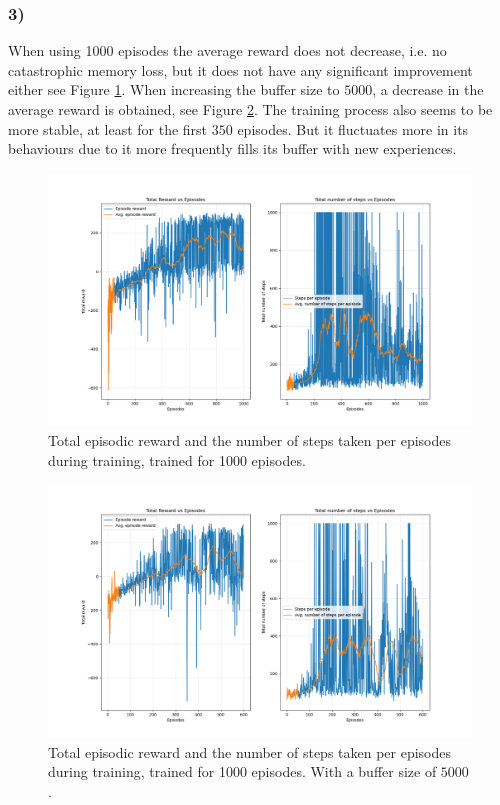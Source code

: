 \documentclass{article}
\begin{document}
\subsubsection*{3)}
When using 1000 episodes the average reward does not decrease, i.e. no catastrophic memory loss, but it does not have any significant improvement either see Figure \ref{fig:episodes1000}. When increasing the buffer size to $5000$, a decrease in the average reward is obtained, see Figure \ref{fig:buffer5000}. The training process also seems to be more stable, at least for the first $350$ episodes. But it fluctuates more in its behaviours due to it more frequently fills its buffer with new experiences.  
\begin{figure}[H]
    \centering
    \includegraphics[width=1\textwidth]{Lab_2/problem1/images/episodes1000.png}
    \caption{\small Total episodic reward and the number of steps taken per episodes during training, trained for 1000 episodes. }
    \label{fig:episodes1000}
\end{figure}


\begin{figure}[H]
    \centering
    \includegraphics[width=1\textwidth]{Lab_2/problem1/images/buffer5000.png}
    \caption{\small Total episodic reward and the number of steps taken per episodes during training, trained for 1000 episodes. With a buffer size of $5000$. }
    \label{fig:buffer5000}
\end{figure}
\end{document}
